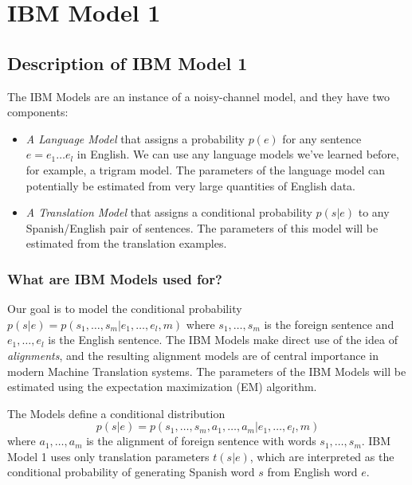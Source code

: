 \section{\textbf{IBM Model 1}}


\subsection{\textbf{Description of IBM Model 1}}

The IBM Models are an instance of a noisy-channel model, and they have two components:

\begin{itemize}
    \item \textit{A Language Model} that assigns a probability $p(e)$ for any sentence $e=e_1\dots e_l$ in English. We can use any language models we've learned before, for example, a trigram model. The parameters of the language model can potentially be estimated from very large quantities of English data.
    \item \textit{A Translation Model} that assigns a conditional probability $p(s|e)$ to any Spanish/English pair of sentences. The parameters of this model will be estimated from the translation examples.
\end{itemize}

\subsubsection{\textbf{What are IBM Models used for?}}

Our goal is to model the conditional probability $p(s|e)=p(s_1,\dots, s_m | e_1, \dots, e_l, m)$ where $s_1,\dots, s_m$ is the foreign sentence and $e_1, \dots, e_l$ is the English sentence. The IBM Models make direct use of the idea of \textit{alignments}, and the resulting alignment models are of central importance in modern Machine Translation systems. The parameters of the IBM Models will be estimated using the expectation maximization (EM) algorithm.

The Models define a conditional distribution $$p(s|e)=p(s_1,\dots, s_m, a_1, \dots, a_m | e_1, \dots, e_l, m)$$ where $a_1, \dots, a_m$ is the alignment of foreign sentence with words $s_1,\dots, s_m$. IBM Model 1 uses only translation parameters $t(s|e)$, which are interpreted as the conditional probability of generating Spanish word $s$ from English word $e$. 

